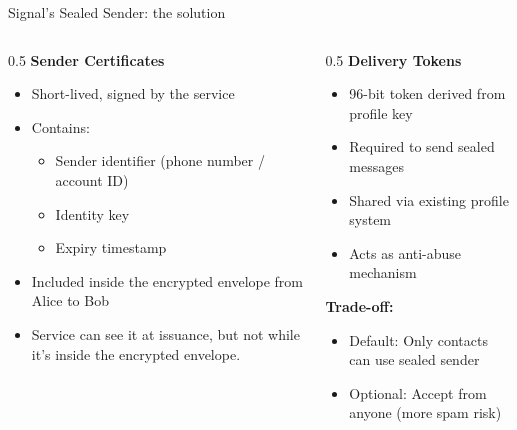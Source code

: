 \ifdefined\PRESENTATION\else\PassOptionsToClass{handout}{beamer}\fi\documentclass[aspectratio=169, lualatex]{beamer}
\begin{document}
\begin{frame}{Signal's Sealed Sender: the solution}
	\begin{columns}
		\begin{column}{0.5\textwidth}
			\textbf{Sender Certificates}
			\begin{itemize}
				\item Short-lived, signed by the service
				\item Contains:
				      \begin{itemize}
					      \item Sender identifier (phone number / account ID)
					      \item Identity key
					      \item Expiry timestamp
				      \end{itemize}
				\item Included inside the encrypted envelope from Alice to Bob
				\item Service can see it at issuance, but not while it's inside the encrypted envelope.
			\end{itemize}
		\end{column}
		\begin{column}{0.5\textwidth}
			\textbf{Delivery Tokens}
			\begin{itemize}
				\item 96-bit token derived from profile key
				\item Required to send sealed messages
				\item Shared via existing profile system
				\item Acts as anti-abuse mechanism
			\end{itemize}
			\textbf{Trade-off:}
			\begin{itemize}
				\item Default: Only contacts can use sealed sender
				\item Optional: Accept from anyone (more spam risk)
			\end{itemize}
		\end{column}
	\end{columns}
\end{frame}
\end{document}
